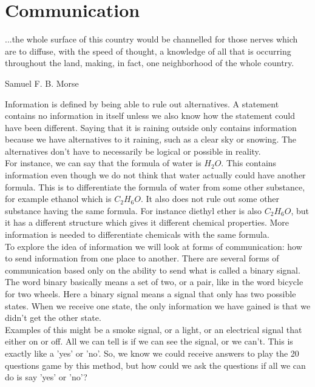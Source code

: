 \section{Communication}

\epigraph{...the whole surface of this country would be channelled for those nerves which are to diffuse, with the speed of thought, a knowledge of all that is occurring throughout the land, making, in fact, one neighborhood of the whole country. }{Samuel F. B. Morse}

Information is defined by being able to rule out alternatives. A statement contains no information in itself unless we also know how the statement could have been different. Saying that it is raining outside only contains information because we have alternatives to it raining, such as a clear sky or snowing. The alternatives don't have to necessarily be logical or possible in reality. \\

For instance, we can say that the formula of water is $H_2 O$. This contains information even though we do not think that water actually could have another formula. This is to differentiate the formula of water from some other substance, for example ethanol which is $C_2 H_6 O$. It also does not rule out some other substance having the same formula. For instance diethyl ether is also $C_2 H_6 O$, but it has a different structure which gives it different chemical properties. More information is needed to differentiate chemicals with the same formula.\\

To explore the idea of information we will look at forms of communication: how to send information from one place to another. There are several forms of communication based only on the ability to send what is called a binary signal. The word binary basically means a set of two, or a pair, like in the word bicycle for two wheels. Here a binary signal means a signal that only has two possible states. When we receive one state, the only information we have gained is that we didn't get the other state.\\

Examples of this might be a smoke signal, or a light, or an electrical signal that either on or off. All we can tell is if we can see the signal, or we can't. This is exactly like a 'yes' or 'no'. So, we know we could receive answers to play the 20 questions game by this method, but how could we ask the questions if all we can do is say 'yes' or 'no'?\\

